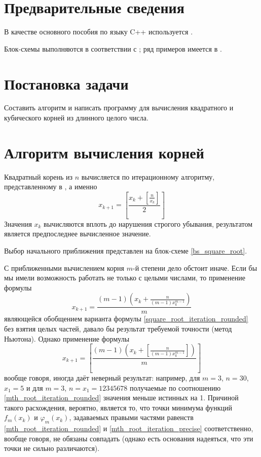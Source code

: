 \documentclass[a4paper,12pt]{article} %
\begin{document}
\setcounter{page}{2}

\section*{Предварительные сведения}

В качестве основного пособия по языку C++ используется \cite{chmyhalo}.


Блок-схемы выполняются в соответствии с \cite{gost-block-scheme};
ряд примеров имеется в \cite{wiki-block-scheme}.


\section*{Постановка задачи}
Составить алгоритм и написать программу
для вычисления квадратного и кубического корней из длинного целого числа.


\section*{Алгоритм вычисления корней}

Квадратный корень из $n$ вычисляется по итерационному алгоритму,
представленному в \cite{Glukhov}, а именно
\begin{equation}\label{square_root_iteration_rounded}
	x_{k+1} = \left[
		\frac{
			x_k+\left[\frac{n}{x_k}\right]
		}{2}
	\right]
\end{equation}
Значения $x_k$ вычисляются вплоть до нарушения строгого убывания,
результатом является предпоследнее вычисленное значение.

Выбор начального приближения представлен на блок-схеме \ref{bs_square_root}.

С приближенными вычислением корня $m$-й степени дело обстоит иначе.
Если бы мы имели возможность работать не только с целыми числами,
то применение формулы
\begin{equation}\label{mth_root_iteration_precise}
	x_{k+1} =
		\frac{(m-1)\left(
			x_k+\frac{n}{(m-1)x_k^{m-1}}
		\right)
		}{m}
\end{equation}
являющейся обобщением варианта формулы \eqref{square_root_iteration_rounded} без взятия целых частей,
давало бы результат требуемой точности (метод Ньютона).
Однако применение формулы
\begin{equation}\label{mth_root_iteration_rounded}
	x_{k+1} = \left[
		\frac{(m-1)\left(
			x_k+\left[\frac{n}{(m-1)x_k^{m-1}}\right]
		\right)
		}{m}
	\right]
\end{equation}
вообще говоря, иногда даёт неверный результат: например,
для $m=3$, $n=30$, $x_1=5$ и для $m=3$, $n=x_1=12345678$
получаемые по соотношению \eqref{mth_root_iteration_rounded}
значения меньше истинных на 1.
Причиной такого расхождения, вероятно, является то, что точки минимума функций
$f_m(x_k)$ и $\varphi_m(x_k)$,
задаваемых правыми частями равенств \eqref{mth_root_iteration_rounded} и \eqref{mth_root_iteration_precise}
соответственно, вообще говоря, не обязаны совпадать
(однако есть основания надеяться, что эти точки не сильно различаются).
\end{document}
